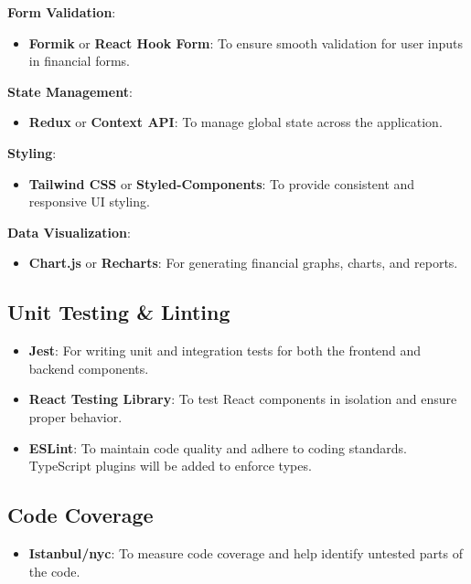 \documentclass{article}
\begin{document}
\textbf{Form Validation}:
\begin{itemize}
  \item \textbf{Formik} or \textbf{React Hook Form}: To ensure smooth validation for user inputs in financial forms.
\end{itemize}

\textbf{State Management}:
\begin{itemize}
  \item \textbf{Redux} or \textbf{Context API}: To manage global state across the application.
\end{itemize}

\textbf{Styling}:
\begin{itemize}
  \item \textbf{Tailwind CSS} or \textbf{Styled-Components}: To provide consistent and responsive UI styling.
\end{itemize}

\textbf{Data Visualization}:
\begin{itemize}
  \item \textbf{Chart.js} or \textbf{Recharts}: For generating financial graphs, charts, and reports.
\end{itemize}

\subsection{Unit Testing \& Linting}
\begin{itemize}
  \item \textbf{Jest}: For writing unit and integration tests for both the frontend and backend components.
  \item \textbf{React Testing Library}: To test React components in isolation and ensure proper behavior.
  \item \textbf{ESLint}: To maintain code quality and adhere to coding standards. TypeScript plugins will be added to enforce types.
\end{itemize}

\subsection{Code Coverage}
\begin{itemize}
  \item \textbf{Istanbul/nyc}: To measure code coverage and help identify untested parts of the code.
\end{itemize}
\end{document}
